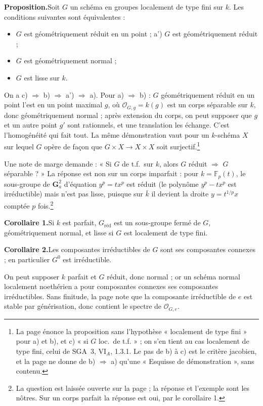 \documentclass[11pt,a4paper]{article}
\begin{document}
\textbf{Proposition.}\quad Soit $G$ un schéma en groupes localement de type fini sur $k$. Les
conditions suivantes sont équivalentes :
\begin{itemize}
\item[a)] $G$ est géométriquement réduit en un point ; a') $G$ est
géométriquement réduit ;
\item[b)] $G$ est géométriquement normal ;
\item[c)] $G$ est lisse sur $k$.
\end{itemize}

On a c) $\Rightarrow$ b) $\Rightarrow$ a') $\Rightarrow$ a). Pour
a) $\Rightarrow$ b) : $G$ géométriquement réduit en un point l'est en un point
maximal $g$, où $\mathcal{O}_{G,g} = k(g)$ est un corps séparable sur $k$,
donc géométriquement normal ; après extension du corps, on peut supposer que
$g$ et un autre point $g'$ sont rationnels, et une translation les échange.
C'est l'homogénéité qui fait tout. La même démonstration vaut pour un
$k$-schéma $X$ sur lequel $G$ opère de façon que $G \times X \to X \times X$
soit surjectif.\footnote{La page énonce la proposition sans l'hypothèse
« localement de type fini » pour a) et b), et c) « si $G$ loc.\ de t.f. » ;
on s'en tient au cas localement de type fini, celui de SGA~3, VI$_{A}$,
1.3.1. Le pas de b) à c) est le critère jacobien, et la page ne donne de
b) $\Rightarrow$ a) qu'une « Esquisse de démonstration », sans contenu.}

Une note de marge demande : « Si $G$ de t.f.\ sur $k$, alors $G$ réduit
$\Rightarrow$ $G$ séparable ? » La réponse est non sur un corps imparfait :
pour $k = \mathbb{F}_{p}(t)$, le sous-groupe de $\mathbf{G}_{a}^{2}$ d'équation
$y^{p} = t x^{p}$ est réduit (le polynôme $y^{p} - t x^{p}$ est irréductible)
mais n'est pas lisse, puisque sur $\bar k$ il devient la droite
$y = t^{1/p} x$ comptée $p$ fois.\footnote{La question est laissée ouverte
sur la page ; la réponse et l'exemple sont les nôtres. Sur un corps parfait
la réponse est oui, par le corollaire 1.}

\textbf{Corollaire 1.}\quad Si $k$ est parfait, $G_{\mathrm{réd}}$ est un sous-groupe fermé de $G$,
géométriquement normal, et lisse si $G$ est localement de type fini.

\textbf{Corollaire 2.}\quad Les composantes irréductibles de $G$ sont ses composantes connexes ; en
particulier $G^{0}$ est irréductible.

On peut supposer $k$ parfait et $G$ réduit, donc normal ; or un schéma
normal localement noethérien a pour composantes connexes ses composantes
irréductibles. Sans finitude, la page note que la composante irréductible
de $e$ est stable par générisation, donc contient le spectre de
$\mathcal{O}_{G,e}$.
\end{document}
